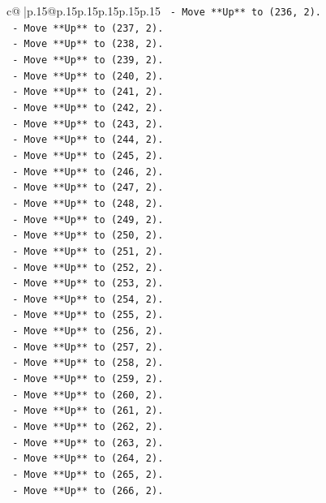 \documentclass{article}
\begin{document}
{\begin{supertabular}{c@{$\;$}|p{.15\linewidth}@{}p{.15\linewidth}p{.15\linewidth}p{.15\linewidth}p{.15\linewidth}p{.15\linewidth}}
{{{\texttt{    {-} Move **Up** to (236, 2).} \\
\texttt{    {-} Move **Up** to (237, 2).} \\
\texttt{    {-} Move **Up** to (238, 2).} \\
\texttt{    {-} Move **Up** to (239, 2).} \\
\texttt{    {-} Move **Up** to (240, 2).} \\
\texttt{    {-} Move **Up** to (241, 2).} \\
\texttt{    {-} Move **Up** to (242, 2).} \\
\texttt{    {-} Move **Up** to (243, 2).} \\
\texttt{    {-} Move **Up** to (244, 2).} \\
\texttt{    {-} Move **Up** to (245, 2).} \\
\texttt{    {-} Move **Up** to (246, 2).} \\
\texttt{    {-} Move **Up** to (247, 2).} \\
\texttt{    {-} Move **Up** to (248, 2).} \\
\texttt{    {-} Move **Up** to (249, 2).} \\
\texttt{    {-} Move **Up** to (250, 2).} \\
\texttt{    {-} Move **Up** to (251, 2).} \\
\texttt{    {-} Move **Up** to (252, 2).} \\
\texttt{    {-} Move **Up** to (253, 2).} \\
\texttt{    {-} Move **Up** to (254, 2).} \\
\texttt{    {-} Move **Up** to (255, 2).} \\
\texttt{    {-} Move **Up** to (256, 2).} \\
\texttt{    {-} Move **Up** to (257, 2).} \\
\texttt{    {-} Move **Up** to (258, 2).} \\
\texttt{    {-} Move **Up** to (259, 2).} \\
\texttt{    {-} Move **Up** to (260, 2).} \\
\texttt{    {-} Move **Up** to (261, 2).} \\
\texttt{    {-} Move **Up** to (262, 2).} \\
\texttt{    {-} Move **Up** to (263, 2).} \\
\texttt{    {-} Move **Up** to (264, 2).} \\
\texttt{    {-} Move **Up** to (265, 2).} \\
\texttt{    {-} Move **Up** to (266, 2).} \\
}}}
\end{supertabular}}
\end{document}
